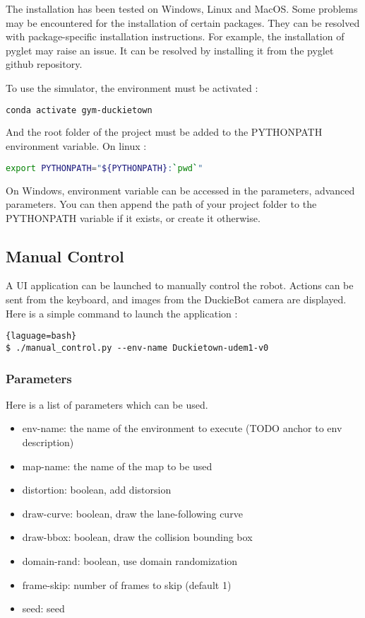 \documentclass[12pt]{article}
\begin{document}
The installation has been tested on Windows, Linux and MacOS. Some problems may be encountered for the installation of certain packages. They can be resolved with package-specific installation instructions. 
For example, the installation of pyglet may raise an issue. It can be resolved by installing it from the pyglet github repository. 

To use the simulator, the environment must be activated :
 
\begin{lstlisting}[language=bash]
    conda activate gym-duckietown
\end{lstlisting}

And the root folder of the project must be added to the PYTHONPATH environment variable.
On linux :
\begin{lstlisting}[language=bash]
    export PYTHONPATH="${PYTHONPATH}:`pwd`"
\end{lstlisting}

On Windows, environment variable can be accessed in the parameters,  advanced parameters. You can then append the path of your project folder to the PYTHONPATH variable if it exists, or create it otherwise.


\subsection{Manual Control}
A UI application can be launched to manually control the robot. Actions can be sent from the keyboard, and images from the DuckieBot camera are displayed. Here is a simple command to launch the application :

\begin{lstlisting}{laguage=bash}
$ ./manual_control.py --env-name Duckietown-udem1-v0
\end{lstlisting}

\subsubsection{Parameters}
Here is a list of parameters which can be used. 

\begin{itemize}
	\item env-name: the name of the environment to execute (TODO anchor to env description)
	\item map-name: the name of the map to be used
	\item distortion: boolean, add distorsion
	\item draw-curve: boolean, draw the lane-following curve
	\item draw-bbox: boolean, draw the collision bounding box
	\item domain-rand: boolean, use domain randomization
	\item frame-skip: number of frames to skip (default 1)
	\item seed: seed
\end{itemize}
\end{document}
